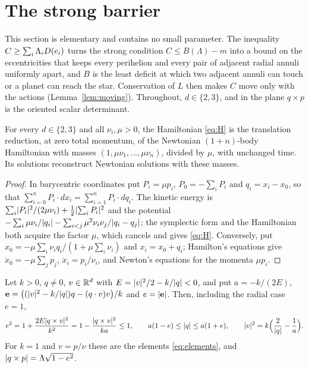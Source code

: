 \section{The strong barrier}
\label{sec:barrier}

This section is elementary and contains no small parameter. The inequality $C\ge\sum_i\Lambda_iD(e_i)$ turns the strong condition $C\le B(\Lambda)-m$ into a bound on the eccentricities that keeps every perihelion and every pair of adjacent radial annuli uniformly apart, and $B$ is the least deficit at which two adjacent annuli can touch or a planet can reach the star. Conservation of $L$ then makes $C$ move only with the actions (Lemma~\ref{lem:moving}). Throughout, $d\in\{2,3\}$, and in the plane $q\times p$ is the oriented scalar determinant.

\begin{lemma}[Normalization]
\label{lem:normalization}
For every $d\in\{2,3\}$ and all $\nu_i,\mu>0$, the Hamiltonian \eqref{eq:H} is the translation reduction, at zero total momentum, of the Newtonian $(1+n)$-body Hamiltonian with masses $(1,\mu\nu_1,\dots,\mu\nu_n)$, divided by $\mu$, with unchanged time. Its solutions reconstruct Newtonian solutions with these masses.
\end{lemma}

\begin{proof}
In barycentric coordinates put $P_i=\mu p_i$, $P_0=-\sum_iP_i$ and $q_i=x_i-x_0$, so that $\sum_{i=0}^nP_i\cdot dx_i=\sum_{i=1}^nP_i\cdot dq_i$. The kinetic energy is $\sum_i\lvert P_i\rvert^2/(2\mu\nu_i)+\frac12\lvert \sum_iP_i\rvert^2$ and the potential $-\sum_i\mu\nu_i/\lvert q_i\rvert-\sum_{i<j}\mu^2\nu_i\nu_j/\lvert q_i-q_j\rvert$; the symplectic form and the Hamiltonian both acquire the factor $\mu$, which cancels and gives \eqref{eq:H}. Conversely, put $x_0=-\mu\sum_i\nu_iq_i/(1+\mu\sum_i\nu_i)$ and $x_i=x_0+q_i$; Hamilton's equations give $\dot x_0=-\mu\sum_jp_j$, $\dot x_i=p_i/\nu_i$, and Newton's equations for the momenta $\mu p_i$.
\end{proof}

\begin{lemma}
\label{lem:orbital}
Let $k>0$, $q\ne0$, $v\in\mathbb{R}^d$ with $E=\lvert v\rvert^2/2-k/\lvert q\rvert<0$, and put $a=-k/(2E)$, $\mathbf{e}=\big((\lvert v\rvert^2-k/\lvert q\rvert)q-(q\cdot v)v\big)/k$ and $e=\lvert \mathbf{e}\rvert$. Then, including the radial case $e=1$,
\begin{equation}
\label{eq:orb}
e^2=1+\frac{2E\lvert q\times v\rvert^2}{k^2}=1-\frac{\lvert q\times v\rvert^2}{ka}\le1,\qquad
a(1-e)\le\lvert q\rvert\le a(1+e),\qquad \lvert v\rvert^2=k\Big(\frac{2}{\lvert q\rvert}-\frac1a\Big).
\end{equation}
For $k=1$ and $v=p/\nu$ these are the elements \eqref{eq:elements}, and $\lvert q\times p\rvert=\Lambda\sqrt{1-e^2}$.
\end{lemma}

